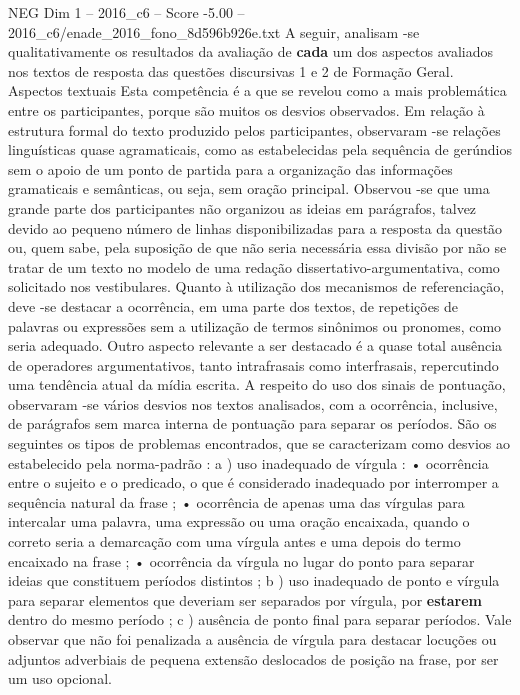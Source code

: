 \begin{textsample}{NEG Dim 1 – 2016\_c6 – Score -5.00 – 2016\_c6/enade\_2016\_fono\_8d596b926e.txt}
A seguir, analisam -se qualitativamente os resultados da avaliação de \textbf{cada} um dos aspectos avaliados nos textos de resposta das questões discursivas 1 e 2 de Formação Geral.
Aspectos textuais Esta competência é a que se revelou como a mais problemática entre os participantes, porque são muitos os desvios observados.
Em relação à estrutura formal do texto produzido pelos participantes, observaram -se relações linguísticas quase agramaticais, como as estabelecidas pela sequência de gerúndios sem o apoio de um ponto de partida para a organização das informações gramaticais e semânticas, ou seja, sem oração principal.
Observou -se que uma grande parte dos participantes não organizou as ideias em parágrafos, talvez devido ao pequeno número de linhas disponibilizadas para a resposta da questão ou, quem sabe, pela suposição de que não seria necessária essa divisão por não se tratar de um texto no modelo de uma redação dissertativo-argumentativa, como solicitado nos vestibulares.
Quanto à utilização dos mecanismos de referenciação, deve -se destacar a ocorrência, em uma parte dos textos, de repetições de palavras ou expressões sem a utilização de termos sinônimos ou pronomes, como seria adequado.
Outro aspecto relevante a ser destacado é a quase total ausência de operadores argumentativos, tanto intrafrasais como interfrasais, repercutindo uma tendência atual da mídia escrita.
A respeito do uso dos sinais de pontuação, observaram -se vários desvios nos textos analisados, com a ocorrência, inclusive, de parágrafos sem marca interna de pontuação para separar os períodos.
São os seguintes os tipos de problemas encontrados, que se caracterizam como desvios ao estabelecido pela norma-padrão : a ) uso inadequado de vírgula : • ocorrência entre o sujeito e o predicado, o que é considerado inadequado por interromper a sequência natural da frase ; • ocorrência de apenas uma das vírgulas para intercalar uma palavra, uma expressão ou uma oração encaixada, quando o correto seria a demarcação com uma vírgula antes e uma depois do termo encaixado na frase ; • ocorrência da vírgula no lugar do ponto para separar ideias que constituem períodos distintos ; b ) uso inadequado de ponto e vírgula para separar elementos que deveriam ser separados por vírgula, por \textbf{estarem} dentro do mesmo período ; c ) ausência de ponto final para separar períodos.
Vale observar que não foi penalizada a ausência de vírgula para destacar locuções ou adjuntos adverbiais de pequena extensão deslocados de posição na frase, por ser um uso opcional.

\end{textsample}
